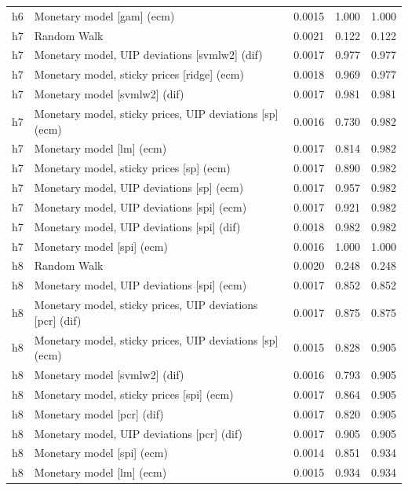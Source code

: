 \begin{ThreePartTable}
\begin{longtable}[t]{cp{5.5cm}ccc}
h6 & \raggedright Monetary model [gam] (ecm) & 0.0015 & 1.000 & 1.000\\
\addlinespace
h7 & \raggedright Random Walk & 0.0021 & 0.122 & 0.122\\
h7 & \raggedright Monetary model, UIP deviations [svmlw2] (dif) & 0.0017 & 0.977 & 0.977\\
h7 & \raggedright Monetary model, sticky prices [ridge] (ecm) & 0.0018 & 0.969 & 0.977\\
h7 & \raggedright Monetary model [svmlw2] (dif) & 0.0017 & 0.981 & 0.981\\
h7 & \raggedright Monetary model, sticky prices, UIP deviations [sp] (ecm) & 0.0016 & 0.730 & 0.982\\
h7 & \raggedright Monetary model [lm] (ecm) & 0.0017 & 0.814 & 0.982\\
h7 & \raggedright Monetary model, sticky prices [sp] (ecm) & 0.0017 & 0.890 & 0.982\\
h7 & \raggedright Monetary model, UIP deviations [sp] (ecm) & 0.0017 & 0.957 & 0.982\\
h7 & \raggedright Monetary model, UIP deviations [spi] (ecm) & 0.0017 & 0.921 & 0.982\\
h7 & \raggedright Monetary model, UIP deviations [spi] (dif) & 0.0018 & 0.982 & 0.982\\
h7 & \raggedright Monetary model [spi] (ecm) & 0.0016 & 1.000 & 1.000\\
\addlinespace
h8 & \raggedright Random Walk & 0.0020 & 0.248 & 0.248\\
h8 & \raggedright Monetary model, UIP deviations [spi] (ecm) & 0.0017 & 0.852 & 0.852\\
h8 & \raggedright Monetary model, sticky prices, UIP deviations [pcr] (dif) & 0.0017 & 0.875 & 0.875\\
h8 & \raggedright Monetary model, sticky prices, UIP deviations [sp] (ecm) & 0.0015 & 0.828 & 0.905\\
h8 & \raggedright Monetary model [svmlw2] (dif) & 0.0016 & 0.793 & 0.905\\
h8 & \raggedright Monetary model, sticky prices [spi] (ecm) & 0.0017 & 0.864 & 0.905\\
h8 & \raggedright Monetary model [pcr] (dif) & 0.0017 & 0.820 & 0.905\\
h8 & \raggedright Monetary model, UIP deviations [pcr] (dif) & 0.0017 & 0.905 & 0.905\\
h8 & \raggedright Monetary model [spi] (ecm) & 0.0014 & 0.851 & 0.934\\
h8 & \raggedright Monetary model [lm] (ecm) & 0.0015 & 0.934 & 0.934\\

\end{longtable}
\end{ThreePartTable}

